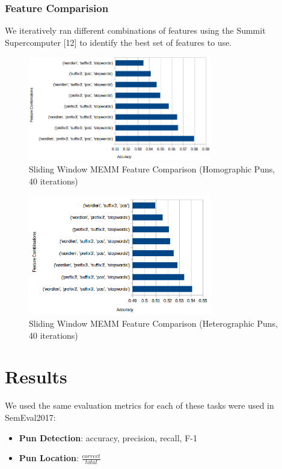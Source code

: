 \documentclass{article}
\begin{document}
\subsubsection{Feature Comparision}

We iteratively ran different combinations of features using the Summit
Supercomputer [12] to identify the best set of features to use. 

\begin{figure}[h!]
    \centering
    \includegraphics[width=8cm]{figures/sliding_window_homographic.png}
	\caption{Sliding Window MEMM Feature Comparison (Homographic Puns, 40 iterations)}
    \label{fig:method}
\end{figure}

\begin{figure}[h!]
    \centering
    \includegraphics[width=8cm]{figures/sliding_window_heterographic.png}
	\caption{Sliding Window MEMM Feature Comparison (Heterographic Puns, 40 iterations)}
    \label{fig:method}
\end{figure}


\section{Results}\label{results}

We used the same evaluation metrics for each of these tasks were used in
SemEval2017:

\begin{itemize}
	\item{
		\textbf{Pun Detection}: accuracy, precision, recall, F-1
	}
	\item{
		\textbf{Pun Location}: $\frac{correct}{total}$
	}
\end{itemize}
\end{document}
